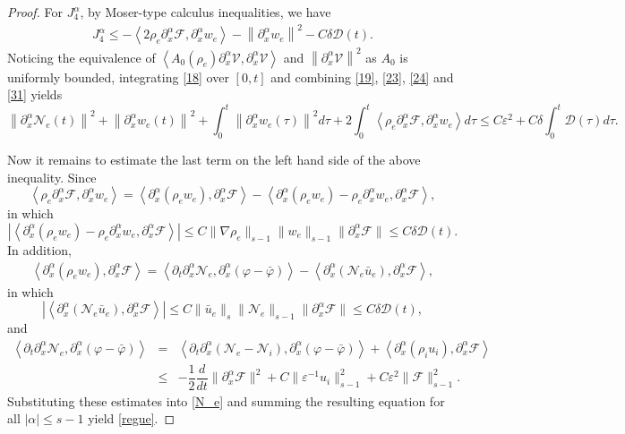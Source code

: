 \documentclass[reqno,twoside,12pt,a4paper]{amsart}
\newcommand{\eps}{\mathbb{\varepsilon}}
\newcommand{\al}{\alpha}
\newcommand{\pt}{\partial_t}
\newcommand{\pa}{\partial}
\newcommand{\D}{\nabla}
\newcommand{\vp}{\varphi}
\newcommand{\calf}{\mathcal{F}}
\newcommand{\Ni}{\mathcal{N}_i}
\newcommand{\Ne}{\mathcal{N}_e}
\numberwithin{equation}{section}
\begin{document}
\begin{proof}
For $J_4^\alpha$, by Moser-type calculus inequalities,  we have
\begin{eqnarray}\label{31}
         J_4^\alpha \leq  -\left\langle 2\rho_e \pa_x^\al \calf , \pa_x^\al w_e \right\rangle-  \left\|\pa_x^\al w_e \right\|^2- C\delta\mathcal{D}(t). 
\end{eqnarray}
Noticing the equivalence of $\left< A_0(\rho_e)\pa_x^\al \mathcal{V}, \pa_x^\al \mathcal{V} \right>$ and $\left\|\pa_x^\al \mathcal{V}\right\|^2$ as $A_0$ is uniformly bounded, integrating \eqref{18} over $[0,t]$ and combining \eqref{19}, \eqref{23}, \eqref{24} and \eqref{31} yields
\begin{equation}\label{N_e}
    \left\|\pa_x^\al \mathcal{N}_e(t)\right\|^2+\left\|\pa_x^\al w_e(t)\right\|^2+ \int_{0}^{t}\left\|\pa_x^\al w_e(\tau)\right\|^2 d\tau+2\int_{0}^{t} \left\langle \rho_e \pa_x^\al \calf , \pa_x^\al w_e \right\rangle d\tau \leq  C\eps^2+C\delta \int_0^t \mathcal{D}(\tau)d\tau.
\end{equation}

Now it remains to estimate the last term on the left hand side of the above inequality. Since
\[
\left<\rho_e\pa_x^\al\calf,\pa_x^\al w_e\right>=\left<\pa_x^\al (\rho_e w_e), \pa_x^\al \calf\right>-\left<\pa_x^\al (\rho_e w_e)-\rho_e\pa_x^\al w_e,\pa_x^\al\calf\right>,
\]
in which 
\[
\left|\left<\pa_x^\al (\rho_e w_e)-\rho_e\pa_x^\al w_e,\pa_x^\al\calf\right>\right|\leq C\|\D \rho_e\|_{s-1}\|w_e\|_{s-1}\|\pa_x^\al \calf\|\leq C\delta \mathcal{D}(t).
\]
In addition, 
\begin{eqnarray*}
\left<\pa_x^\al (\rho_e w_e), \pa_x^\al \calf\right>=\left<\pt\pa_x^\al\Ne,\pa_x^\al(\vp-\bar{\vp})\right>-\left<\pa_x^\al(\Ne\bar{u}_e),\pa_x^\al \calf\right>,
\end{eqnarray*}
in which 
\[
\left|\left<\pa_x^\al(\Ne\bar{u}_e),\pa_x^\al \calf\right>\right|\leq C\|\bar{u}_e\|_s\|\Ne\|_{s-1}\|\pa_x^\al \calf\|\leq C\delta\mathcal{D}(t),
\]
and
\begin{eqnarray*}
\left<\pt\pa_x^\al\Ne,\pa_x^\al(\vp-\bar{\vp})\right>&=&\left<\pt\pa_x^\al(\Ne-\Ni),\pa_x^\al(\vp-\bar{\vp})\right>+\left<\pa_x^\al(\rho_iu_i),\pa_x^\al\calf\right>\nonumber\\
&\leq& -\dfrac{1}{2}\dfrac{d}{dt}\|\pa_x^\al\calf\|^2+C\|\eps^{-1}u_i\|_{s-1}^2+C\eps^2\|\calf\|_{s-1}^2.
\end{eqnarray*}
Substituting these estimates into \eqref{N_e} and summing the resulting equation for all $|\al|\leq s-1$ yield \eqref{regue}. 
\end{proof}
\end{document}
